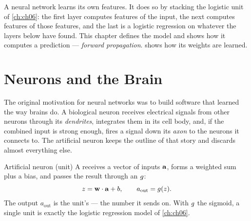 A neural network learns its own features. It does so by stacking the logistic
unit of \cref{ch:ch06}: the first layer computes features of the input, the next
computes features of those features, and the last is a logistic regression on
whatever the layers below have found. This chapter defines the model and shows
how it computes a prediction --- \emph{forward propagation}.  shows
how its weights are learned.

\section{Neurons and the Brain}
\label{sec:neurons-brain}

The original motivation for neural networks was to build software that learned
the way brains do. A biological neuron receives electrical signals from other
neurons through its \emph{dendrites}, integrates them in its cell body, and, if
the combined input is strong enough, fires a signal down its \emph{axon} to the
neurons it connects to. The artificial neuron keeps the outline of that story
and discards almost everything else.

\begin{defbox}{Artificial neuron (unit)}
A  receives a vector of inputs $\mathbf{a}$, forms a weighted sum plus a
bias, and passes the result through an  $g$:
\[
  z = \mathbf{w}\cdot\mathbf{a} + b, \qquad a_{\text{out}} = g(z) .
\]
The output $a_{\text{out}}$ is the unit's  --- the number it
sends on. With $g$ the sigmoid, a single unit is exactly the logistic
regression model of \cref{ch:ch06}.
\end{defbox}

